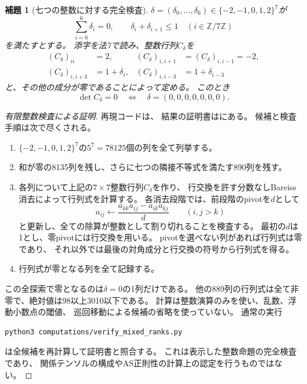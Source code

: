 \documentclass[11pt,a4paper]{ltjsarticle}
\newtheorem{lemma}[theorem]{補題}
\theoremstyle{definition}
\begin{document}
\begin{lemma}[七つの整数に対する完全検査]
\label{idx:lem:mixed-rank-integer-check}
$\delta=(\delta_0,\ldots,\delta_6)\in\{-2,-1,0,1,2\}^7$が
\[
\sum_{i=0}^6\delta_i=0,\qquad
\delta_i+\delta_{i+1}\leq1\quad(i\in\mathbb Z/7\mathbb Z)
\]
を満たすとする。
添字を法7で読み、整数行列$C_\delta$を
\begin{align*}
(C_\delta)_{ii}&=2,&
(C_\delta)_{i,i+1}&=(C_\delta)_{i,i-1}=-2,\\
(C_\delta)_{i,i+3}&=1+\delta_i,&
(C_\delta)_{i,i-3}&=1+\delta_{i-3}
\end{align*}
と、その他の成分が零であることによって定める。
このとき
\[
\det C_\delta=0\quad\Longleftrightarrow\quad
\delta=(0,0,0,0,0,0,0).
\]
\end{lemma}
\begin{proof}[有限整数検査による証明]
再現コードは、
結果の証明書はにある。
候補と検査手順は次で尽くされる。
\begin{enumerate}
\item $\{-2,-1,0,1,2\}^7$の$5^7=78125$個の列を全て列挙する。
\item 和が零の8135列を残し、さらに七つの隣接不等式を満たす890列を残す。
\item 各列について上記の$7\times7$整数行列$C_\delta$を作り、
行交換を許す分数なしBareiss消去によって行列式を計算する。
各消去段階では、前段階のpivotを$d$として
\[
a_{ij}\longleftarrow
\frac{a_{kk}a_{ij}-a_{ik}a_{kj}}{d}\qquad(i,j>k)
\]
と更新し、全ての除算が整数として割り切れることを検査する。
最初の$d$は1とし、零pivotには行交換を用いる。
pivotを選べない列があれば行列式は零であり、
それ以外では最後の対角成分と行交換の符号から行列式を得る。
\item 行列式が零となる列を全て記録する。
\end{enumerate}
この全探索で零となるのは$\delta=0$の1列だけである。
他の889列の行列式は全て非零で、絶対値は98以上3010以下である。
計算は整数演算のみを使い、乱数、浮動小数点の閾値、
巡回移動による候補の省略を使っていない。
通常の実行
\begin{verbatim}
python3 computations/verify_mixed_ranks.py
\end{verbatim}
は全候補を再計算して証明書と照合する。
これは表示した整数命題の完全検査であり、
関係テンソルの構成やAS正則性の計算上の認定を行うものではない。
\end{proof}
\end{document}
